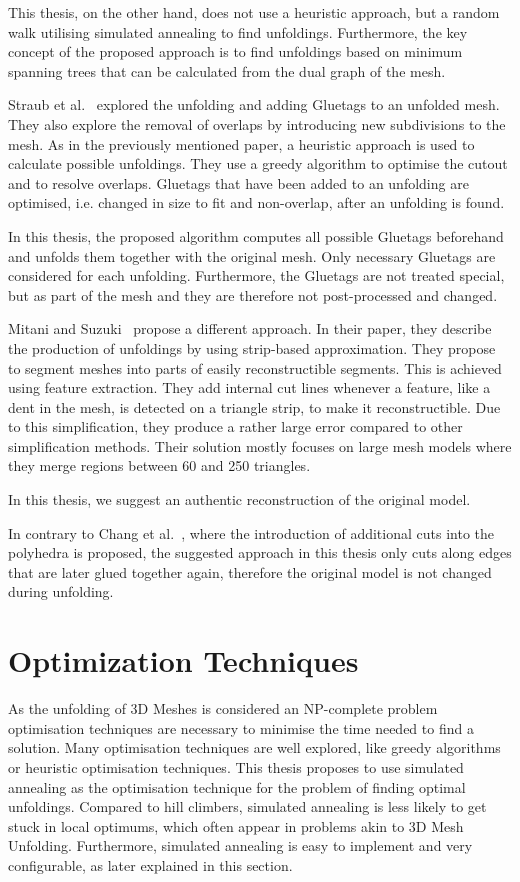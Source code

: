 \documentclass[draft,final]{vutinfth} %
\begin{document}
This thesis, on the other hand, does not use a heuristic approach, but a random walk utilising simulated annealing to find unfoldings. Furthermore, the key concept of the proposed approach is to find unfoldings based on minimum spanning trees that can be calculated from the dual graph of the mesh.

Straub et al.~\cite{straubcreating} explored the unfolding and adding Gluetags to an unfolded mesh. They also explore the removal of overlaps by introducing new subdivisions to the mesh. As in the previously mentioned paper, a heuristic approach is used to calculate possible unfoldings. They use a greedy algorithm to optimise the cutout and to resolve overlaps. Gluetags that have been added to an unfolding are optimised, i.e. changed in size to fit and non-overlap, after an unfolding is found.

In this thesis, the proposed algorithm computes all possible Gluetags beforehand and unfolds them together with the original mesh. Only necessary Gluetags are considered for each unfolding. Furthermore, the Gluetags are not treated special, but as part of the mesh and they are therefore not post-processed and changed.

Mitani and Suzuki~\cite{mitani2004making} propose a different approach. In their paper, they describe the production of unfoldings by using strip-based approximation. They propose to segment meshes into parts of easily reconstructible segments. This is achieved using feature extraction. They add internal cut lines whenever a feature, like a dent in the mesh, is detected on a triangle strip, to make it reconstructible. Due to this simplification, they produce a rather large error compared to other simplification methods. Their solution mostly focuses on large mesh models where they merge regions between 60 and 250 triangles.

In this thesis, we suggest an authentic reconstruction of the original model. 

In contrary to Chang et al.~\cite{chang2017improved}, where the introduction of additional cuts into the polyhedra is proposed, the suggested approach in this thesis only cuts along edges that are later glued together again, therefore the original model is not changed during unfolding.

\section{Optimization Techniques}
\label{sec:sa}
As the unfolding of 3D Meshes is considered an NP-complete problem\cite{haenselmann2012optimal} optimisation techniques are necessary to minimise the time needed to find a solution. Many optimisation techniques are well explored, like greedy algorithms\cite{devore1996some} or heuristic optimisation techniques\cite{lee2008modern}. This thesis proposes to use simulated annealing as the optimisation technique for the problem of finding optimal unfoldings. Compared to hill climbers, simulated annealing is less likely to get stuck in local optimums, which often appear in problems akin to 3D Mesh Unfolding. Furthermore, simulated annealing is easy to implement and very configurable, as later explained in this section.
\end{document}
